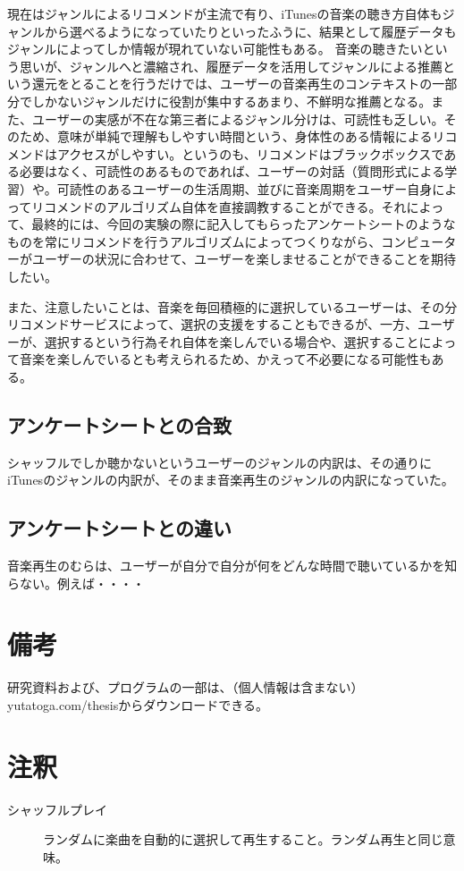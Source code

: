 \documentclass{jsarticle}
\begin{document}
現在はジャンルによるリコメンドが主流で有り、iTunesの音楽の聴き方自体もジャンルから選べるようになっていたりといったふうに、結果として履歴データもジャンルによってしか情報が現れていない可能性もある。
音楽の聴きたいという思いが、ジャンルへと濃縮され、履歴データを活用してジャンルによる推薦という還元をとることを行うだけでは、ユーザーの音楽再生のコンテキストの一部分でしかないジャンルだけに役割が集中するあまり、不鮮明な推薦となる。また、ユーザーの実感が不在な第三者によるジャンル分けは、可読性も乏しい。そのため、意味が単純で理解もしやすい時間という、身体性のある情報によるリコメンドはアクセスがしやすい。というのも、リコメンドはブラックボックスである必要はなく、可読性のあるものであれば、ユーザーの対話（質問形式による学習）や。可読性のあるユーザーの生活周期、並びに音楽周期をユーザー自身によってリコメンドのアルゴリズム自体を直接調教することができる。それによって、最終的には、今回の実験の際に記入してもらったアンケートシートのようなものを常にリコメンドを行うアルゴリズムによってつくりながら、コンピューターがユーザーの状況に合わせて、ユーザーを楽しませることができることを期待したい。

また、注意したいことは、音楽を毎回積極的に選択しているユーザーは、その分リコメンドサービスによって、選択の支援をすることもできるが、一方、ユーザーが、選択するという行為それ自体を楽しんでいる場合や、選択することによって音楽を楽しんでいるとも考えられるため、かえって不必要になる可能性もある。
\subsection{アンケートシートとの合致}
シャッフルでしか聴かないというユーザーのジャンルの内訳は、その通りにiTunesのジャンルの内訳が、そのまま音楽再生のジャンルの内訳になっていた。

\subsection{アンケートシートとの違い}
音楽再生のむらは、ユーザーが自分で自分が何をどんな時間で聴いているかを知らない。例えば・・・・

\section{備考}
研究資料および、プログラムの一部は、（個人情報は含まない）
yutatoga.com/thesisからダウンロードできる。

\section{注釈}
\begin{description}
\item[シャッフルプレイ]
ランダムに楽曲を自動的に選択して再生すること。ランダム再生と同じ意味。

\end{description}
\end{document}
